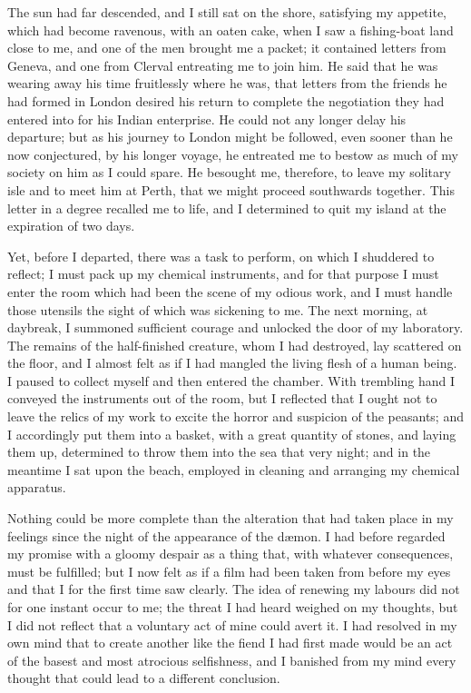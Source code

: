 \documentclass[12pt,openright]{book}
\begin{document}
The sun had far descended, and I still sat on the shore, satisfying my appetite, which had become ravenous, with an oaten cake, when I saw a fishing-boat land close to me, and one of the men brought me a packet; it contained letters from Geneva, and one from Clerval entreating me to join him. He said that he was wearing away his time fruitlessly where he was, that letters from the friends he had formed in London desired his return to complete the negotiation they had entered into for his Indian enterprise. He could not any longer delay his departure; but as his journey to London might be followed, even sooner than he now conjectured, by his longer voyage, he entreated me to bestow as much of my society on him as I could spare. He besought me, therefore, to leave my solitary isle and to meet him at Perth, that we might proceed southwards together. This letter in a degree recalled me to life, and I determined to quit my island at the expiration of two days.

Yet, before I departed, there was a task to perform, on which I shuddered to reflect; I must pack up my chemical instruments, and for that purpose I must enter the room which had been the scene of my odious work, and I must handle those utensils the sight of which was sickening to me. The next morning, at daybreak, I summoned sufficient courage and unlocked the door of my laboratory. The remains of the half-finished creature, whom I had destroyed, lay scattered on the floor, and I almost felt as if I had mangled the living flesh of a human being. I paused to collect myself and then entered the chamber. With trembling hand I conveyed the instruments out of the room, but I reflected that I ought not to leave the relics of my work to excite the horror and suspicion of the peasants; and I accordingly put them into a basket, with a great quantity of stones, and laying them up, determined to throw them into the sea that very night; and in the meantime I sat upon the beach, employed in cleaning and arranging my chemical apparatus.

Nothing could be more complete than the alteration that had taken place in my feelings since the night of the appearance of the dæmon. I had before regarded my promise with a gloomy despair as a thing that, with whatever consequences, must be fulfilled; but I now felt as if a film had been taken from before my eyes and that I for the first time saw clearly. The idea of renewing my labours did not for one instant occur to me; the threat I had heard weighed on my thoughts, but I did not reflect that a voluntary act of mine could avert it. I had resolved in my own mind that to create another like the fiend I had first made would be an act of the basest and most atrocious selfishness, and I banished from my mind every thought that could lead to a different conclusion.
\end{document}
